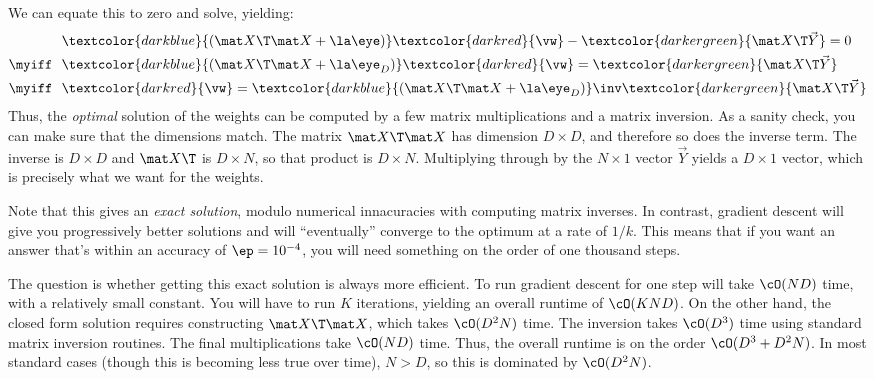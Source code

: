 %
We can equate this to zero and solve, yielding:
%
\begin{align}
     & \textcolor{darkblue}{\left( \mat X \T \mat X + \la \eye \right)} \textcolor{darkred}{\vw} - \textcolor{darkergreen}{\mat X \T \vec Y} = 0\\
\myiff~~ & \textcolor{darkblue}{\left( \mat X \T \mat X + \la \eye_D \right)} \textcolor{darkred}{\vw} = \textcolor{darkergreen}{\mat X \T \vec Y} \\
\myiff~~ & \textcolor{darkred}{\vw} = \textcolor{darkblue}{\left( \mat X \T \mat X + \la \eye_D \right)}\inv \textcolor{darkergreen}{\mat X \T \vec Y}
\end{align}
%
Thus, the \emph{optimal} solution of the weights can be computed by a
few matrix multiplications and a matrix inversion.
%
As a sanity check, you can make sure that the dimensions match.  The
matrix $\mat X\T\mat X$ has dimension $D\times D$, and therefore so
does the inverse term.  The inverse is $D\times D$ and $\mat X\T$ is
$D\times N$, so that product is $D\times N$.  Multiplying through by
the $N\times 1$ vector $\vec Y$ yields a $D \times 1$ vector, which is
precisely what we want for the weights.


Note that this gives an \emph{exact solution}, modulo numerical
innacuracies with computing matrix inverses.  In contrast, gradient
descent will give you progressively better solutions and will
``eventually'' converge to the optimum at a rate of $1/k$.  This means
that if you want an answer that's within an accuracy of $\ep =
10^{-4}$, you will need something on the order of one thousand steps.

The question is whether getting this exact solution is always more
efficient.  To run gradient descent for one step will take $\cO(ND)$
time, with a relatively small constant.  You will have to run $K$
iterations, yielding an overall runtime of $\cO(KND)$.  On the other
hand, the closed form solution requires constructing $\mat X\T\mat X$,
which takes $\cO(D^2 N)$ time.  The inversion takes $\cO(D^3)$ time
using standard matrix inversion routines.  The final multiplications
take $\cO(ND)$ time.  Thus, the overall runtime is on the order
$\cO(D^3 + D^2 N)$.  In most standard cases (though this is becoming
less true over time), $N > D$, so this is dominated by $\cO(D^2 N)$.

